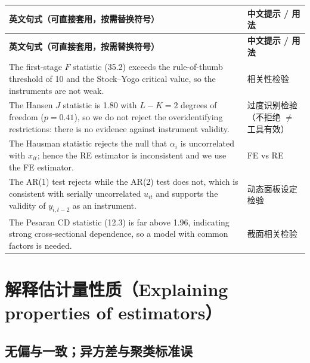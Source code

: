 {\renewcommand{\arraystretch}{1.15}\begin{longtable}{@{}>{\raggedright\arraybackslash}p{11.4cm}>{\raggedright\arraybackslash\small}p{4.3cm}@{}}
\toprule
\textbf{英文句式（可直接套用，按需替换符号）} & \textbf{中文提示 / 用法}\\
\midrule
\endfirsthead
\toprule
\textbf{英文句式（可直接套用，按需替换符号）} & \textbf{中文提示 / 用法}\\
\midrule
\endhead
\bottomrule
\endlastfoot
The first-stage $F$ statistic (35.2) exceeds the rule-of-thumb threshold of 10 and the Stock--Yogo critical value, so the instruments are not weak. & 相关性检验\\
\addlinespace[2pt]
The Hansen $J$ statistic is 1.80 with $L-K=2$ degrees of freedom ($p=0.41$), so we do not reject the overidentifying restrictions: there is no evidence against instrument validity. & 过度识别检验（不拒绝 $\neq$ 工具有效）\\
\addlinespace[2pt]
The Hausman statistic rejects the null that $\alpha_i$ is uncorrelated with $x_{it}$; hence the RE estimator is inconsistent and we use the FE estimator. & FE vs RE\\
\addlinespace[2pt]
The AR(1) test rejects while the AR(2) test does not, which is consistent with serially uncorrelated $u_{it}$ and supports the validity of $y_{i,t-2}$ as an instrument. & 动态面板设定检验\\
\addlinespace[2pt]
The Pesaran CD statistic (12.3) is far above 1.96, indicating strong cross-sectional dependence, so a model with common factors is needed. & 截面相关检验\\
\end{longtable}}


\section{解释估计量性质（Explaining properties of estimators）}\label{sec:UappC-props}

\subsection{无偏与一致；异方差与聚类标准误}


